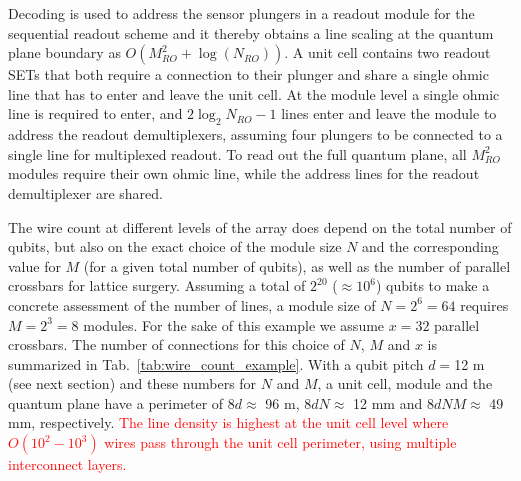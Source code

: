 \documentclass[aps,prl,reprint,superscriptaddress,floatfix]{revtex4-1}
\begin{document}
Decoding is used to address the sensor plungers in a readout module for the sequential readout scheme and it thereby obtains a line scaling at the quantum plane boundary as $O(M_{RO}^2+\log(N_{RO}))$.
A unit cell contains two readout SETs that both require a connection to their plunger and share a single ohmic line that has to enter and leave the unit cell.
At the module level a single ohmic line is required to enter, and $2\log_2 N_{RO}-1$ lines enter and leave the module to address the readout demultiplexers, assuming four plungers to be connected to a single line for multiplexed readout.
To read out the full quantum plane, all $M_{RO}^2$ modules require their own ohmic line, while the address lines for the readout demultiplexer are shared.

The wire count at different levels of the array does depend on the total number of qubits, but also on the exact choice of the module size $N$ and the corresponding value for $M$ (for a given total number of qubits), as well as the number of parallel crossbars for lattice surgery.
Assuming a total of $2^{20}$ ($\approx10^6$) qubits to make a concrete assessment of the number of lines, a module size of $N = 2^6 = 64$ requires $M = 2^3 = 8$ modules.
For the sake of this example we assume $x=32$ parallel crossbars.
The number of connections for this choice of $N$, $M$ and $x$ is summarized in Tab.~\ref{tab:wire_count_example}.
With a qubit pitch $d=$12 \textmu m (see next section) and these numbers for $N$ and $M$, a unit cell, module and the quantum plane have a perimeter of $8d\approx$ 96 \textmu m, $8dN\approx$ 12 mm and $8dNM\approx$ 49 mm, respectively.
\textcolor{red}{The line density is highest at the unit cell level where $O(10^2-10^3)$ wires pass through the unit cell perimeter, using multiple interconnect layers.
}
\end{document}

